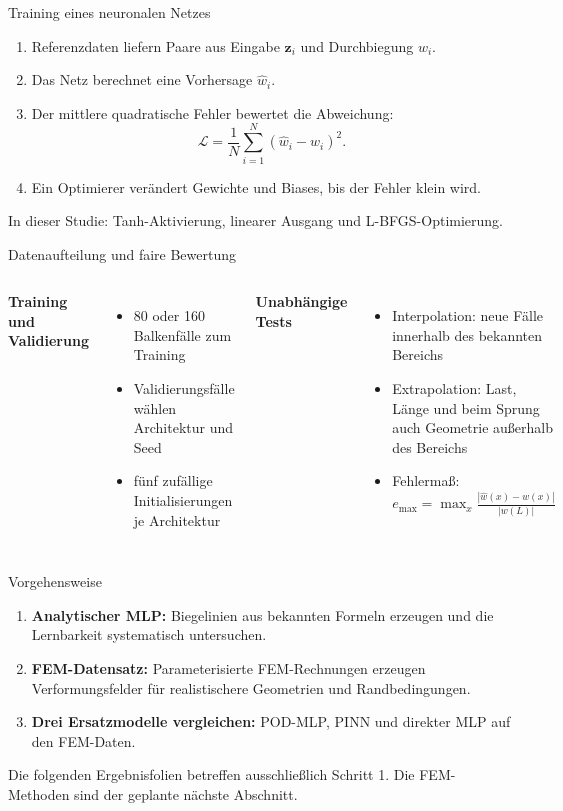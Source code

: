 \documentclass[aspectratio=169,10pt]{beamer}
\begin{document}
\begin{frame}{Training eines neuronalen Netzes}
\begin{enumerate}
  \item Referenzdaten liefern Paare aus Eingabe $\boldsymbol{z}_i$ und Durchbiegung $w_i$.
  \item Das Netz berechnet eine Vorhersage $\widehat w_i$.
  \item Der mittlere quadratische Fehler bewertet die Abweichung:
  \[
  \mathcal{L}=\frac{1}{N}\sum_{i=1}^{N}\left(\widehat w_i-w_i\right)^2.
  \]
  \item Ein Optimierer verändert Gewichte und Biases, bis der Fehler klein wird.
\end{enumerate}
\vfill In dieser Studie: Tanh-Aktivierung, linearer Ausgang und L-BFGS-Optimierung.
\end{frame}

\begin{frame}{Datenaufteilung und faire Bewertung}
\begin{columns}[T]
\textbf{Training und Validierung}
\begin{itemize}
  \item 80 oder 160 Balkenfälle zum Training
  \item Validierungsfälle wählen Architektur und Seed
  \item fünf zufällige Initialisierungen je Architektur
\end{itemize}
\textbf{Unabhängige Tests}
\begin{itemize}
  \item Interpolation: neue Fälle innerhalb des bekannten Bereichs
  \item Extrapolation: Last, Länge und beim Sprung auch Geometrie außerhalb des Bereichs
  \item Fehlermaß: $e_{\max}=\max_x\frac{|\widehat w(x)-w(x)|}{|w(L)|}$
\end{itemize}
\end{columns}
\end{frame}

\begin{frame}{Vorgehensweise}
\begin{enumerate}
  \item \textbf{Analytischer MLP:} Biegelinien aus bekannten Formeln erzeugen und die Lernbarkeit systematisch untersuchen.
  \item \textbf{FEM-Datensatz:} Parameterisierte FEM-Rechnungen erzeugen Verformungsfelder für realistischere Geometrien und Randbedingungen.
  \item \textbf{Drei Ersatzmodelle vergleichen:} POD-MLP, PINN und direkter MLP auf den FEM-Daten.
\end{enumerate}
\vfill Die folgenden Ergebnisfolien betreffen ausschließlich Schritt 1. Die FEM-Methoden sind der geplante nächste Abschnitt.
\end{frame}
\end{document}
